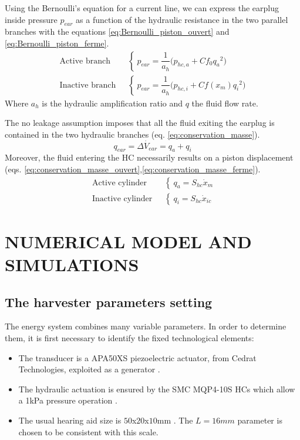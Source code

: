 \documentclass[3p,twocolumn,preprint]{elsarticle}
\begin{document}
Using the Bernoulli's equation for a current line, we can express the earplug inside pressure $p_{ear}$ as a function of the hydraulic resistance in the two parallel branches with the equations \ref{eq:Bernoulli_piston_ouvert} and \ref{eq:Bernoulli_piston_ferme}.
\begin{align}
	\text{Active branch ~}& \left\{~
	p_{ear} = \dfrac{1}{a_h}\biggl(p_{hc,a} + Cf_0 {q_a}^2 \biggr)
	\right.
	\label{eq:Bernoulli_piston_ouvert}\\
	\text{Inactive branch ~}& \left\{~
	p_{ear} = \dfrac{1}{a_h}\biggl(p_{hc,i} + Cf(x_m) {q_i}^2 \biggr)
	\right.
	\label{eq:Bernoulli_piston_ferme}
\end{align}
Where $a_h$ is the hydraulic amplification ratio and $q$ the fluid flow rate.

The no leakage assumption imposes that all the fluid exiting the earplug is contained in the two hydraulic branches (eq. \ref{eq:conservation_masse}).
\begin{equation}
	q_{ear} = \dot{\Delta V_{ear}} = q_a + q_i
	\label{eq:conservation_masse}
\end{equation}
Moreover, the fluid entering the HC necessarily results on a piston displacement (eqs. \ref{eq:conservation_masse_ouvert},\ref{eq:conservation_masse_ferme}).
\begin{align}
	\text{Active cylinder ~}& \left\{~
	q_a = S_{hc} \dot{x}_m
	\right.
	\label{eq:conservation_masse_ouvert}\\
	\text{Inactive cylinder ~}& \left\{~
	q_i = S_{hc} \dot{x}_{ic}
	\right.
	\label{eq:conservation_masse_ferme}
\end{align}
\section{NUMERICAL MODEL AND SIMULATIONS}
\label{sec:NUMERICAL MODEL AND SIMULATIONS}
	\subsection{The harvester parameters setting}	
	\label{subsec:The harvester setting}
The energy system combines many variable parameters. In order to determine them, it is first necessary to identify the fixed technological elements: 
\begin{itemize}
	\item The transducer is a APA50XS piezoelectric actuator, from Cedrat Technologies, exploited as a generator \cite{CEDRATTECHNOLOGIES2022}.
	\item The hydraulic actuation is ensured by the SMC MQP4-10S HCs which allow a 1kPa pressure operation \cite{SMC2022}.
	\item The usual hearing aid size is $50$x$20$x$10$mm \cite{Quattro2019}. The \mbox{$L=16mm$} parameter is chosen to be consistent with this scale.
\end{itemize}
\end{document}
